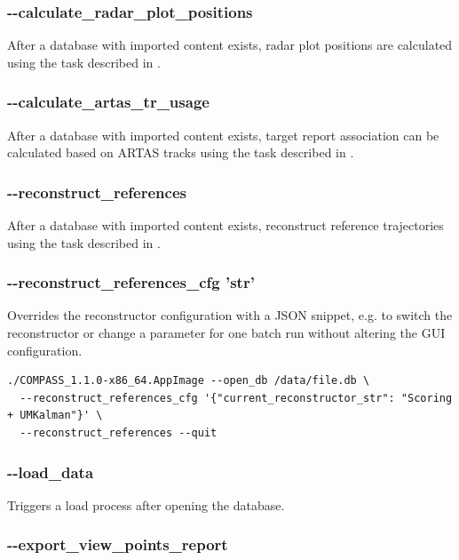 \subsubsection{-{}-calculate\_radar\_plot\_positions}

After a database with imported content exists, radar plot positions are calculated using the task described in .

\subsubsection{-{}-calculate\_artas\_tr\_usage}

After a database with imported content exists, target report association can be calculated based on ARTAS tracks using the task described in .

\subsubsection{-{}-reconstruct\_references}

After a database with imported content exists, reconstruct reference trajectories using the task described in .

\subsubsection{-{}-reconstruct\_references\_cfg 'str'}

Overrides the reconstructor configuration with a JSON snippet, e.g. to switch the reconstructor or change a parameter for one batch run without altering the GUI configuration.

\begin{lstlisting}
./COMPASS_1.1.0-x86_64.AppImage --open_db /data/file.db \
  --reconstruct_references_cfg '{"current_reconstructor_str": "Scoring + UMKalman"}' \
  --reconstruct_references --quit
\end{lstlisting}

\subsubsection{-{}-load\_data}

Triggers a load process after opening the database.

\subsubsection{-{}-export\_view\_points\_report}

